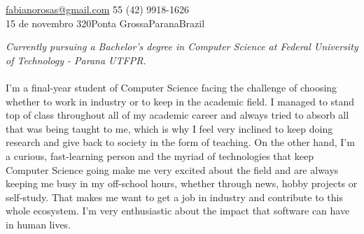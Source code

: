 \documentclass[10pt,a4paper]{article} %
\begin{document}
 


\noindent\href{mailto:fabianorosas@gmail.com}{fabianorosas@gmail.com}\bull
\textsmaller{+}55 (42) 9918-1626\\
15 de novembro 320\bull Ponta Grossa\bull Parana\bull Brazil

\spacedhrule{0.9em}{-0.4em} %



\vspace{-1.3em} %

\begin{multicols}{2}
\noindent
\textit{Currently pursuing a Bachelor's degree in Computer Science at Federal University of Technology - Parana UTFPR.}\\\\
I'm a final-year student of Computer Science facing the challenge of choosing whether to work in industry or to keep in the academic field. I managed to stand top of class throughout all of my academic career and always tried to absorb all that was being taught to me, which is why I feel very inclined to keep doing research and give back to society in the form of teaching. On the other hand, I'm a curious, fast-learning person and the myriad of technologies that keep Computer Science going make me very excited about the field and are always keeping me busy in my off-school hours, whether through news, hobby projects or self-study. That makes me want to get a job in industry and contribute to this whole ecosystem. I'm very enthusiastic about the impact that software can have in human lives.
\end{multicols}

\spacedhrule{0.5em}{-0.4em} %

\end{document}
